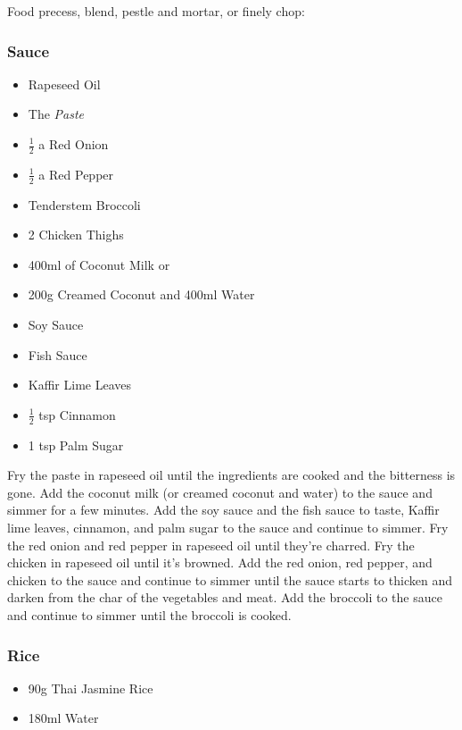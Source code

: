 \documentclass[11pt, english]{article}
\begin{document}
	Food precess, blend, pestle and mortar, or finely chop:

                \subsubsection*{Sauce}

        \begin{itemize}
        \setlength\itemsep{0cm}
                \item Rapeseed Oil
                \item The \textit{Paste}
		\item $\frac{1}{2}$ a Red Onion
                \item $\frac{1}{2}$ a Red Pepper
		\item Tenderstem Broccoli
                \item 2 Chicken Thighs
		\item 400ml of Coconut Milk or
                \item 200g Creamed Coconut and 400ml Water
		\item Soy Sauce
		\item Fish Sauce
                \item Kaffir Lime Leaves
		\item $\frac{1}{2}$ tsp Cinnamon
		\item 1 tsp Palm Sugar
        \end{itemize}

	Fry the paste in rapeseed oil until the ingredients are cooked and the bitterness is gone. Add the coconut milk (or creamed coconut and water) to the sauce and simmer for a few minutes. Add the soy sauce and the fish sauce to taste, Kaffir lime leaves, cinnamon, and palm sugar to the sauce and continue to simmer. Fry the red onion and red pepper in rapeseed oil until they're charred. Fry the chicken in rapeseed oil until it's browned. Add the red onion, red pepper, and chicken to the sauce and continue to simmer until the sauce starts to thicken and darken from the char of the vegetables and meat. Add the broccoli to the sauce and continue to simmer until the broccoli is cooked.

                \subsubsection*{Rice}

        \begin{itemize}
        \setlength\itemsep{0cm}
                \item 90g Thai Jasmine Rice
                \item 180ml Water
        \end{itemize}
\end{document}

